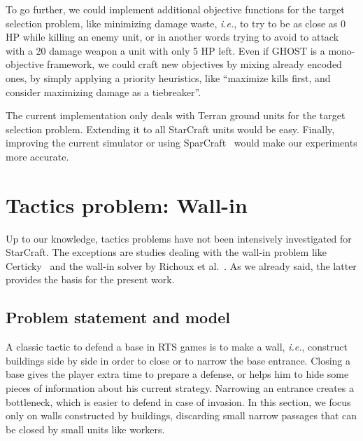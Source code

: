 \documentclass[journal]{IEEEtran}
\newcommand{\ghost}{\textsc{GHOST}\xspace}
\newcommand{\ie}{\textit{i.e.}}
\begin{document}
To go further,  we could implement additional  objective functions for
the target  selection problem, like  minimizing damage waste,  \ie, to
try to  be as close  as 0  HP while killing  an enemy unit, or in another
words trying to avoid to attack with a 20 damage weapon a unit with only 5 HP left.   Even if
\ghost is  a mono-objective framework,  we could craft new  objectives by
mixing already encoded ones, by simply applying a priority heuristics,
like ``maximize  kills first, and  consider maximizing damage  as a
tiebreaker''.

The current implementation only deals  with Terran ground units for the
target selection problem.   Extending it to all  StarCraft units would
be easy. Finally,  improving the current simulator  or using SparCraft~\cite{churchill2013sparcraft}
would make our experiments more accurate.

\section{Tactics problem: Wall-in}\label{sec:wall}

Up  to  our  knowledge,  tactics  problems  have  not  been  intensively
investigated for StarCraft.
The exceptions are studies dealing with the wall-in problem like
Certicky~\cite{Certicky13} and the wall-in solver by Richoux et
al.~\cite{RichouxUO14}. As we already said, the latter provides the
basis for the present work.

\subsection{Problem statement and model}


A classic tactic to defend a base in RTS games is to make a wall, \ie,
construct buildings side by side in order to close or to narrow the
base entrance. Closing a base gives the player extra time to prepare a
defense, or  helps him to  hide some  pieces of information  about his
current strategy. Narrowing an entrance creates a bottleneck, which is easier to
defend in  case of  invasion. In  this section, we  focus  only on
walls constructed by buildings,  discarding small narrow passages that
can be closed by small units like workers.
\end{document}

